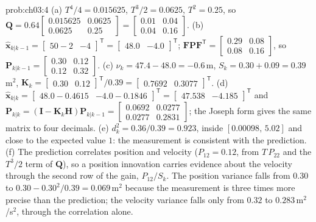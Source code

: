 \documentclass[graybox,envcountchap]{style/SNmono}
\providecommand{\DIFaddbegin}{} %
\providecommand{\DIFaddend}{} %
\begin{document}
\begin{sol}{prob:ch03:4}
(a) $T^{4}/4=0.015625$, $T^{3}/2=0.0625$, $T^{2}=0.25$, so $\mathbf{Q}=0.64\begin{bmatrix}0.015625&0.0625\\0.0625&0.25\end{bmatrix}=\begin{bmatrix}0.01&0.04\\0.04&0.16\end{bmatrix}$.
(b) $\widehat{\mathbf{x}}_{k|k-1}=\begin{bmatrix}50-2&-4\end{bmatrix}^{\mathsf T}=\begin{bmatrix}48.0&-4.0\end{bmatrix}^{\mathsf T}$; $\mathbf{F}\mathbf{P}\mathbf{F}^{\mathsf T}=\begin{bmatrix}0.29&0.08\\0.08&0.16\end{bmatrix}$, so $\mathbf{P}_{k|k-1}=\begin{bmatrix}0.30&0.12\\0.12&0.32\end{bmatrix}$.
(c) $\nu_k=47.4-48.0=-0.6$\,m, $S_k=0.30+0.09=0.39$\,m$^{2}$, $\mathbf{K}_k=\begin{bmatrix}0.30&0.12\end{bmatrix}^{\mathsf T}/0.39=\begin{bmatrix}0.7692&0.3077\end{bmatrix}^{\mathsf T}$.
(d) $\widehat{\mathbf{x}}_{k|k}=\begin{bmatrix}48.0-0.4615&-4.0-0.1846\end{bmatrix}^{\mathsf T}=\begin{bmatrix}47.538&-4.185\end{bmatrix}^{\mathsf T}$ and\DIFaddbegin \allowbreak \DIFaddend $\mathbf{P}_{k|k}=(\mathbf{I}-\mathbf{K}_k\mathbf{H})\mathbf{P}_{k|k-1}=\begin{bmatrix}0.0692&0.0277\\0.0277&0.2831\end{bmatrix}$; the Joseph form gives the same matrix to four decimals.
(e) $d_k^{2}=0.36/0.39=0.923$, inside $[0.00098,\,5.02]$ and close to the expected value $1$: the measurement is consistent with the prediction.
(f) The prediction correlates position and velocity ($P_{12}=0.12$, from $T\,P_{22}$ and the $T^{3}/2$ term of $\mathbf{Q}$), so a position innovation carries evidence about the velocity through the second row of the gain, $P_{12}/S_k$. The position variance falls from $0.30$ to $0.30-0.30^{2}/0.39=0.069$\,m$^{2}$ because the measurement is three times more precise than the prediction; the velocity variance falls only from $0.32$ to $0.283$\,m$^{2}$/s$^{2}$, through the correlation alone.
\end{sol}
\end{document}
